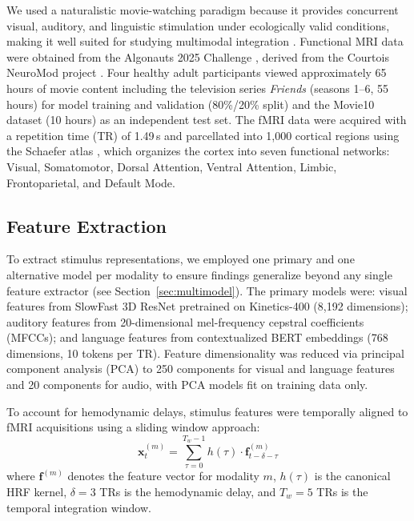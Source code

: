 \documentclass[conference]{IEEEtran}
\begin{document}
We used a naturalistic movie-watching paradigm because it provides concurrent visual, auditory, and linguistic stimulation under ecologically valid conditions, making it well suited for studying multimodal integration \cite{hasson2010reliability}. Functional MRI data were obtained from the Algonauts 2025 Challenge \cite{gifford2024algonauts}, derived from the Courtois NeuroMod project \cite{boyle2023courtois}. Four healthy adult participants viewed approximately 65 hours of movie content including the television series \textit{Friends} (seasons 1--6, 55 hours) for model training and validation (80\%/20\% split) and the Movie10 dataset (10 hours) as an independent test set. The fMRI data were acquired with a repetition time (TR) of 1.49\,s and parcellated into 1,000 cortical regions using the Schaefer atlas \cite{schaefer2018local}, which organizes the cortex into seven functional networks: Visual, Somatomotor, Dorsal Attention, Ventral Attention, Limbic, Frontoparietal, and Default Mode.

\subsection{Feature Extraction}

To extract stimulus representations, we employed one primary and one alternative model per modality to ensure findings generalize beyond any single feature extractor (see Section~\ref{sec:multimodel}). The primary models were: visual features from SlowFast 3D ResNet pretrained on Kinetics-400 \cite{feichtenhofer2019slowfast} (8,192 dimensions); auditory features from 20-dimensional mel-frequency cepstral coefficients (MFCCs); and language features from contextualized BERT embeddings \cite{devlin2019bert} (768 dimensions, 10 tokens per TR). Feature dimensionality was reduced via principal component analysis (PCA) to 250 components for visual and language features and 20 components for audio, with PCA models fit on training data only.

To account for hemodynamic delays, stimulus features were temporally aligned to fMRI acquisitions using a sliding window approach:
\begin{equation}\label{eq:xt}
\mathbf{x}_t^{(m)} = \sum_{\tau=0}^{T_w-1} h(\tau) \cdot \mathbf{f}_{t-\delta-\tau}^{(m)}
\end{equation}
where $\mathbf{f}^{(m)}$ denotes the feature vector for modality $m$, $h(\tau)$ is the canonical HRF kernel, $\delta = 3$ TRs is the hemodynamic delay, and $T_w = 5$ TRs is the temporal integration window.
\end{document}
